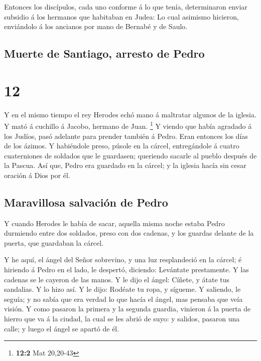  Entonces los discípulos, cada uno conforme á lo que tenía,
determinaron enviar subsidio á los hermanos que habitaban en Judea:
 Lo cual asimismo hicieron, enviándolo á los ancianos por
mano de Bernabé y de Saulo.

\hypertarget{muerte-de-santiago-arresto-de-pedro}{%
\subsection{Muerte de Santiago, arresto de
Pedro}\label{muerte-de-santiago-arresto-de-pedro}}

\hypertarget{section-11}{%
\section{12}\label{section-11}}

 Y en el mismo tiempo el rey Herodes echó mano á maltratar
algunos de la iglesia.  Y mató á cuchillo á Jacobo, hermano
de Juan. \footnote{\textbf{12:2} Mat 20,20-43}  Y viendo que
había agradado á los Judíos, pasó adelante para prender también á Pedro.
Eran entonces los días de los ázimos.  Y habiéndole preso,
púsole en la cárcel, entregándole á cuatro cuaterniones de soldados que
le guardasen; queriendo sacarle al pueblo después de la Pascua.
 Así que, Pedro era guardado en la cárcel; y la iglesia
hacía sin cesar oración á Dios por él.

\hypertarget{maravillosa-salvaciuxf3n-de-pedro}{%
\subsection{Maravillosa salvación de
Pedro}\label{maravillosa-salvaciuxf3n-de-pedro}}

 Y cuando Herodes le había de sacar, aquella misma noche
estaba Pedro durmiendo entre dos soldados, preso con dos cadenas, y los
guardas delante de la puerta, que guardaban la cárcel.

 Y he aquí, el ángel del Señor sobrevino, y una luz
resplandeció en la cárcel; é hiriendo á Pedro en el lado, le despertó,
diciendo: Levántate prestamente. Y las cadenas se le cayeron de las
manos.  Y le dijo el ángel: Cíñete, y átate tus sandalias. Y
lo hizo así. Y le dijo: Rodéate tu ropa, y sígueme.  Y
saliendo, le seguía; y no sabía que era verdad lo que hacía el ángel,
mas pensaba que veía visión.  Y como pasaron la primera y
la segunda guardia, vinieron á la puerta de hierro que va á la ciudad,
la cual se les abrió de suyo: y salidos, pasaron una calle; y luego el
ángel se apartó de él.

